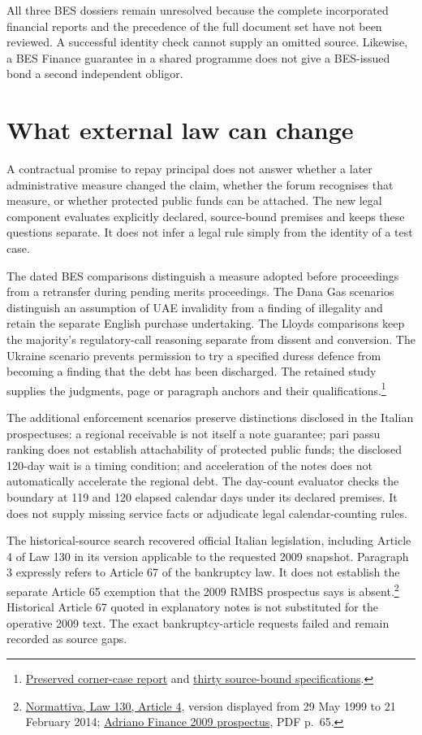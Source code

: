 \documentclass[11pt,a4paper]{article}
\begin{document}
All three BES dossiers remain unresolved because the complete incorporated
financial reports and the precedence of the full document set have not been
reviewed. A successful identity check cannot supply an omitted source.
Likewise, a BES Finance guarantee in a shared programme does not give a
BES-issued bond a second independent obligor.

\section*{What external law can change}

A contractual promise to repay principal does not answer whether a later
administrative measure changed the claim, whether the forum recognises that
measure, or whether protected public funds can be attached. The new legal
component evaluates explicitly declared, source-bound premises and keeps these
questions separate. It does not infer a legal rule simply from the identity of
a test case.

The dated BES comparisons distinguish a measure adopted before proceedings
from a retransfer during pending merits proceedings. The Dana Gas scenarios
distinguish an assumption of UAE invalidity from a finding of illegality and
retain the separate English purchase undertaking. The Lloyds comparisons keep
the majority's regulatory-call reasoning separate from dissent and conversion.
The Ukraine scenario prevents permission to try a specified duress defence from
becoming a finding that the debt has been discharged. The retained study supplies
the judgments, page or paragraph anchors and their qualifications.\footnote{\href{../prospectus-corner-cases-2026-10-04/REPORT.md}{Preserved corner-case report} and \href{../prospectus-corner-cases-2026-10-04/test-specifications.json}{thirty source-bound specifications}.}

The additional enforcement scenarios preserve distinctions disclosed in the
Italian prospectuses: a regional receivable is not itself a note guarantee;
pari passu ranking does not establish attachability of protected public funds;
the disclosed 120-day wait is a timing condition; and acceleration of the notes
does not automatically accelerate the regional debt. The day-count evaluator
checks the boundary at 119 and 120 elapsed calendar days under its declared
premises. It does not supply missing service facts or adjudicate legal
calendar-counting rules.

The historical-source search recovered official Italian legislation, including
Article 4 of Law 130 in its version applicable to the requested 2009 snapshot.
Paragraph 3 expressly refers to Article 67 of the bankruptcy law. It does not
establish the separate Article 65 exemption that the 2009 RMBS prospectus
says is absent.\footnote{\href{../../prospectus/corner-repair-2026-10-04/sources/jur-repair-italy-130-art4/source.html}{Normattiva, Law 130, Article 4}, version displayed from 29 May 1999 to 21 February 2014; \href{../../prospectus/corner-cases-2026-10-04/sources/jur-more-hypo-1123807/source.pdf}{Adriano Finance 2009 prospectus}, PDF p.~65.}
Historical Article 67 quoted in explanatory notes is not substituted for the
operative 2009 text. The exact bankruptcy-article requests failed and remain
recorded as source gaps.
\end{document}
